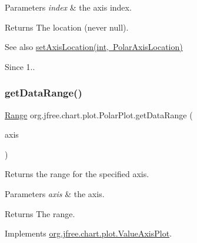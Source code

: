 \begin{DoxyParams}{Parameters}
{\em index} & the axis index.\\
\hline
\end{DoxyParams}
\begin{DoxyReturn}{Returns}
The location (never {\ttfamily null}).
\end{DoxyReturn}
\begin{DoxySeeAlso}{See also}
\mbox{\hyperlink{classorg_1_1jfree_1_1chart_1_1plot_1_1_polar_plot_aa546acbfeb18c870e59eea53057ac79b}{set\+Axis\+Location(int, Polar\+Axis\+Location)}}
\end{DoxySeeAlso}
\begin{DoxySince}{Since}
1.. 
\end{DoxySince}
\mbox{\label{classorg_1_1jfree_1_1chart_1_1plot_1_1_polar_plot_ae99b116f3485ce4f6ad153f75153eee3}} 
\subsubsection{\texorpdfstring{get\+Data\+Range()}{getDataRange()}}
{\footnotesize\ttfamily \mbox{\hyperlink{classorg_1_1jfree_1_1data_1_1_range}{Range}} org.\+jfree.\+chart.\+plot.\+Polar\+Plot.\+get\+Data\+Range (\begin{DoxyParamCaption}\item[{\mbox{\hyperlink{classorg_1_1jfree_1_1chart_1_1axis_1_1_value_axis}{Value\+Axis}}}]{axis }\end{DoxyParamCaption})}

Returns the range for the specified axis.


\begin{DoxyParams}{Parameters}
{\em axis} & the axis.\\
\hline
\end{DoxyParams}
\begin{DoxyReturn}{Returns}
The range. 
\end{DoxyReturn}


Implements \mbox{\hyperlink{interfaceorg_1_1jfree_1_1chart_1_1plot_1_1_value_axis_plot_a54815b2f078c11b2618804fe3e7e5353}{org.\+jfree.\+chart.\+plot.\+Value\+Axis\+Plot}}.


